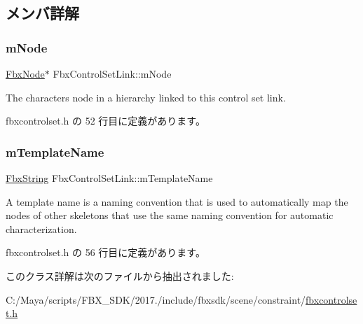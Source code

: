 \subsection{メンバ詳解}
\mbox{\label{class_fbx_control_set_link_a3996e9ed3db015da6c94b9f6c9b7c4f9}} 
\subsubsection{\texorpdfstring{m\+Node}{mNode}}
{\footnotesize\ttfamily \hyperlink{class_fbx_node}{Fbx\+Node}$\ast$ Fbx\+Control\+Set\+Link\+::m\+Node}



The character\textquotesingle{}s node in a hierarchy linked to this control set link. 



 fbxcontrolset.\+h の 52 行目に定義があります。

\mbox{\label{class_fbx_control_set_link_ac35309cd74ccd53e6b69273fafafbf7e}} 
\subsubsection{\texorpdfstring{m\+Template\+Name}{mTemplateName}}
{\footnotesize\ttfamily \hyperlink{class_fbx_string}{Fbx\+String} Fbx\+Control\+Set\+Link\+::m\+Template\+Name}

A template name is a naming convention that is used to automatically map the nodes of other skeletons that use the same naming convention for automatic characterization. 

 fbxcontrolset.\+h の 56 行目に定義があります。



このクラス詳解は次のファイルから抽出されました\+:\begin{DoxyCompactItemize}
\item 
C\+:/\+Maya/scripts/\+F\+B\+X\+\_\+\+S\+D\+K/2017./include/fbxsdk/scene/constraint/\hyperlink{fbxcontrolset_8h}{fbxcontrolset.\+h}\end{DoxyCompactItemize}
